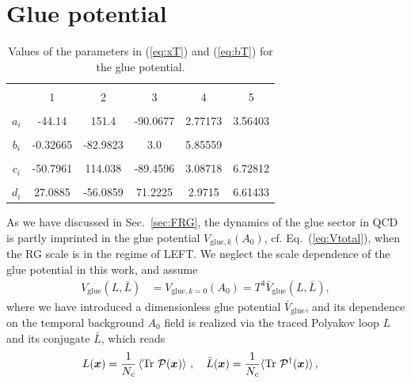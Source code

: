 \documentclass[%
reprint,
superscriptaddress,
showpacs,preprintnumbers,
amsmath,amssymb,
aps,
prd,
]{revtex4-1}
\newcommand{\Tr}{\ensuremath{\operatorname{Tr}}}
\def\Eq#1{Eq.~(\ref{#1})}
\def\eq#1{(\ref{#1})}
\def\sec#1{Sec.~\ref{#1}}
\begin{document}
\section{Glue potential}\label{app:gluepot}
%
\begin{table}[t]
\begin{center}
\begin{tabular}{|c||c|c|c|c|c|}
\hline & & & & &  \\[-2ex]
\hline & & & & & \\[-1ex]
& 1 & 2 & 3 & 4 & 5 \\[1ex]
\hline & & & & &  \\[-2ex]
$a_i$ &-44.14& 151.4 & -90.0677 &2.77173 &3.56403 \\[1ex]
\hline & & & & &  \\[-2ex]
$b_i$ &-0.32665 &-82.9823 &3.0 &5.85559  &              \\[1ex]
\hline & & & & &  \\[-2ex]
$c_i$ &-50.7961 &114.038 &-89.4596 &3.08718 &6.72812 \\[1ex]
\hline & & & & &  \\[-2ex]
$d_i$ & 27.0885 &-56.0859 &71.2225 &2.9715 &6.61433 \\[1ex]
\hline
\end{tabular}
\caption{Values of the parameters in \eq{eq:xT} and \eq{eq:bT} for the glue potential.}
\label{tab:gluepotCoeffs}
\end{center}\vspace{-0.5cm}
\end{table}
%
As we have discussed in \sec{sec:FRG}, the dynamics of the glue sector in QCD is partly imprinted in the glue potential $V_{\mathrm{glue},k}(A_0)$, cf. \Eq{eq:Vtotal}, when the RG scale is in the regime of LEFT. We neglect the scale dependence of the glue potential in this work, and assume
%
\begin{align}
V_\mathrm{glue}(L,\bar{L})&=V_{\mathrm{glue},k=0}(A_0)=T^4 \bar V_\mathrm{glue}(L,\bar{L}),\label{}
\end{align}
%
where we have introduced a dimensionless glue potential $\bar V_\mathrm{glue}$, and its dependence on the temporal background $A_0$ field is realized via the traced Polyakov loop $L$ and its conjugate $\bar{L}$, which reads
%
\begin{align}
L(\bm{x})&=\frac{1}{N_c} \left\langle \Tr\, {\cal P}(\bm x)\right\rangle\,,\quad  \bar L (\bm{x})=\frac{1}{N_c} \langle \Tr\,{\cal P}^{\dagger}(\bm x)\rangle \,,\label{eq:Lloop}
\end{align}
\end{document}
